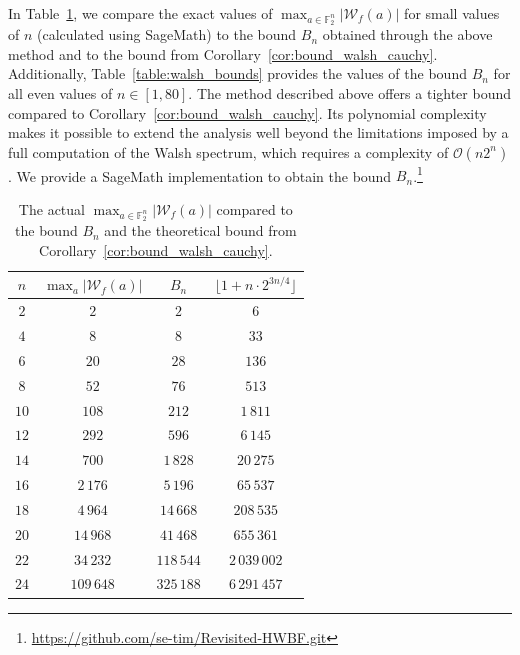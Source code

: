 \documentclass[runningheads,orivec]{llncs}
\newcommand{\F}{\mathbb{F}}
\newcommand{\wt}[1]{\mathcal W_{#1}}
\begin{document}
    \bigskip
    
    In Table~\ref{table:max_walsh_vs_bound}, we compare the exact values of $\max_{a\in\mathbb F_2^n}|\wt f(a)|$ for small values of $n$ (calculated using \textsf{SageMath}) to the bound $B_n$ obtained through the above method and to the bound from Corollary~\ref{cor:bound_walsh_cauchy}. Additionally, Table~\ref{table:walsh_bounds} provides the values of the bound $B_n$ for all even values of $n\in[1,80]$. The method described above offers a tighter bound compared to Corollary~\ref{cor:bound_walsh_cauchy}. Its polynomial complexity makes it possible to extend the analysis well beyond the limitations imposed by a full computation of the Walsh spectrum, which requires a complexity of $\mathcal O(n2^n)$. We provide a \textsf{SageMath} implementation to obtain the bound $B_n$.\footnote{\url{https://github.com/se-tim/Revisited-HWBF.git}}
    
    \begin{table}
    	\scriptsize
    	\centering
        \caption{The actual $\max_{a\in\F_2^n}|\wt f(a)|$ compared to the bound $B_n$ and the theoretical bound from Corollary~\ref{cor:bound_walsh_cauchy}.}
    	\label{table:max_walsh_vs_bound}
    	\begin{tabular}{|c|c|c|c|}
    		\hline
    		$n$ & $\max_a|\wt f(a)|$ & $B_n$  & $\lfloor 1+n\cdot 2^{3n/4} \rfloor$\\
            \hline
            $2$&$2$&$2$&$6$\\
            $4$&$8$&$8$&$33$\\
            $6$&$20$&$28$&$136$\\
            $8$&$52$&$76$&$513$\\
            $10$&$108$&$212$&$1\,811$\\
            $12$&$292$&$596$&$6\,145$\\
            $14$&$700$&$1\,828$&$20\,275$\\
            $16$&$2\,176$&$5\,196$&$65\,537$\\
            $18$&$4\,964$&$14\,668$&$208\,535$\\
            $20$&$14\,968$&$41\,468$&$655\,361$\\
            $22$&$34\,232$&$118\,544$&$2\,039\,002$\\
            $24$&$109\,648$&$325\,188$&$6\,291\,457$\\
    		\hline
    	\end{tabular}
    \end{table}
    
\end{document}
